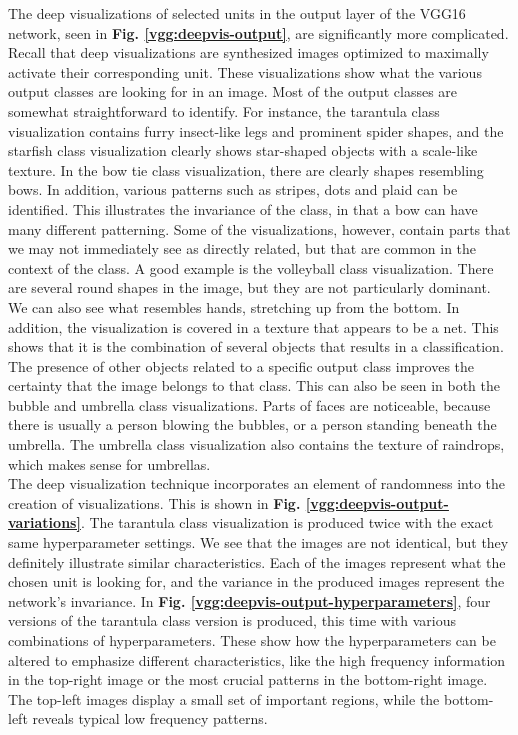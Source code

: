 \noindent The deep visualizations of selected units in the output layer of the VGG16 network, seen in \textbf{Fig. \ref{vgg:deepvis-output}}, are significantly more complicated. Recall that deep visualizations are synthesized images optimized to maximally activate their corresponding unit. These visualizations show what the various output classes are looking for in an image. Most of the output classes are somewhat straightforward to identify. For instance, the tarantula class visualization contains furry insect-like legs and prominent spider shapes, and the starfish class visualization clearly shows star-shaped objects with a scale-like texture. In the bow tie class visualization, there are clearly shapes resembling bows. In addition, various patterns such as stripes, dots and plaid can be identified. This illustrates the invariance of the class, in that a bow can have many different patterning. Some of the visualizations, however, contain parts that we may not immediately see as directly related, but that are common in the context of the class. A good example is the volleyball class visualization. There are several round shapes in the image, but they are not particularly dominant. We can also see what resembles hands, stretching up from the bottom. In addition, the visualization is covered in a texture that appears to be a net. This shows that it is the combination of several objects that results in a classification. The presence of other objects related to a specific output class improves the certainty that the image belongs to that class. This can also be seen in both the bubble and umbrella class visualizations. Parts of faces are noticeable, because there is usually a person blowing the bubbles, or a person standing beneath the umbrella. The umbrella class visualization also contains the texture of raindrops, which makes sense for umbrellas. \\

\noindent The deep visualization technique incorporates an element of randomness into the creation of visualizations. This is shown in \textbf{Fig. \ref{vgg:deepvis-output-variations}}. The tarantula class visualization is produced twice with the exact same hyperparameter settings. We see that the images are not identical, but they definitely illustrate similar characteristics. Each of the images represent what the chosen unit is looking for, and the variance in the produced images represent the network's invariance. In \textbf{Fig. \ref{vgg:deepvis-output-hyperparameters}}, four versions of the tarantula class version is produced, this time with various combinations of hyperparameters. These show how the hyperparameters can be altered to emphasize different characteristics, like the high frequency information in the top-right image or the most crucial patterns in the bottom-right image. The top-left images display a small set of important regions, while the bottom-left reveals typical low frequency patterns. \\

